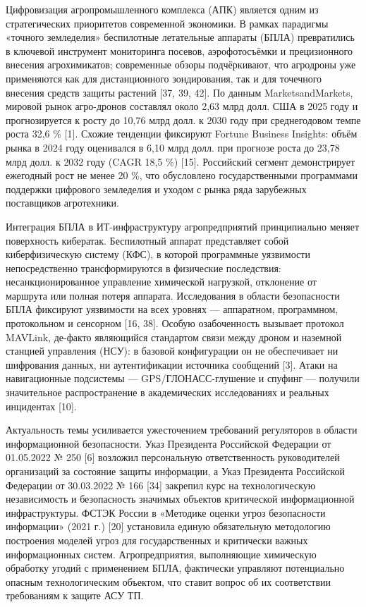 Цифровизация агропромышленного комплекса (АПК) является одним из стратегических приоритетов современной экономики. В рамках парадигмы «точного земледелия» беспилотные летательные аппараты (БПЛА) превратились в ключевой инструмент мониторинга посевов, аэрофотосъёмки и прецизионного внесения агрохимикатов; современные обзоры подчёркивают, что агродроны уже применяются как для дистанционного зондирования, так и для точечного внесения средств защиты растений {[}37, 39, 42{]}. По данным MarketsandMarkets, мировой рынок агро-дронов составлял около 2,63 млрд долл. США в 2025 году и прогнозируется к росту до 10,76 млрд долл. к 2030 году при среднегодовом темпе роста 32,6 \% {[}1{]}. Схожие тенденции фиксируют Fortune Business Insights: объём рынка в 2024 году оценивался в 6,10 млрд долл. при прогнозе роста до 23,78 млрд долл. к 2032 году (CAGR 18,5 \%) {[}15{]}. Российский сегмент демонстрирует ежегодный рост не менее 20 \%, что обусловлено государственными программами поддержки цифрового земледелия и уходом с рынка ряда зарубежных поставщиков агротехники.

Интеграция БПЛА в ИТ-инфраструктуру агропредприятий принципиально меняет поверхность кибератак. Беспилотный аппарат представляет собой киберфизическую систему (КФС), в которой программные уязвимости непосредственно трансформируются в физические последствия: несанкционированное управление химической нагрузкой, отклонение от маршрута или полная потеря аппарата. Исследования в области безопасности БПЛА фиксируют уязвимости на всех уровнях --- аппаратном, программном, протокольном и сенсорном {[}16, 38{]}. Особую озабоченность вызывает протокол MAVLink, де-факто являющийся стандартом связи между дроном и наземной станцией управления (НСУ): в базовой конфигурации он не обеспечивает ни шифрования данных, ни аутентификации источника сообщений {[}3{]}. Атаки на навигационные подсистемы --- GPS/ГЛОНАСС-глушение и спуфинг --- получили значительное распространение в академических исследованиях и реальных инцидентах {[}10{]}.

Актуальность темы усиливается ужесточением требований регуляторов в области информационной безопасности. Указ Президента Российской Федерации от 01.05.2022 № 250 {[}6{]} возложил персональную ответственность руководителей организаций за состояние защиты информации, а Указ Президента Российской Федерации от 30.03.2022 № 166 {[}34{]} закрепил курс на технологическую независимость и безопасность значимых объектов критической информационной инфраструктуры. ФСТЭК России в «Методике оценки угроз безопасности информации» (2021 г.) {[}20{]} установила единую обязательную методологию построения моделей угроз для государственных и критически важных информационных систем. Агропредприятия, выполняющие химическую обработку угодий с применением БПЛА, фактически управляют потенциально опасным технологическим объектом, что ставит вопрос об их соответствии требованиям к защите АСУ ТП.

